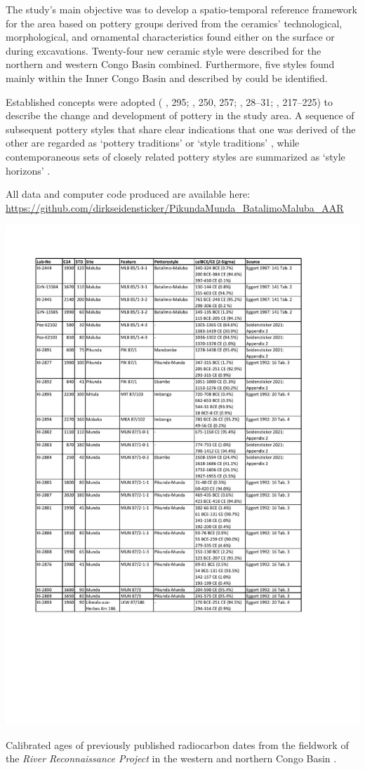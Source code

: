 \documentclass[smallextended,natbib]{svjour3}       %
\begin{document}
The study's main objective was to develop a spatio-temporal reference framework for the area based on pottery groups derived from the ceramics' technological, morphological, and ornamental characteristics found either on the surface or during excavations. Twenty-four new ceramic style were described for the northern and western Congo Basin combined. Furthermore, five styles found mainly within the Inner Congo Basin and described by \citet{Wotzka.1995} could be identified.

Established concepts were adopted (\citeauthor{Eggert.1983} \citeyear{Eggert.1983}, 295; \citeyear{Eggert.1984}, 250, 257; \citeyear{Eggert.1988}, 28--31; \citeauthor{Wotzka.1995} \citeyear{Wotzka.1995}, 217--225) to describe the change and development of pottery in the study area. A sequence of subsequent pottery styles that share clear indications that one was derived of the other are regarded as ‘pottery traditions’ or ‘style traditions’ \citep{Rouse.1957,Willey.1945}, while contemporaneous sets of closely related pottery styles are summarized as ‘style horizons’ \citep[108--111]{Kroeber.1944}.

All data and computer code produced are available here: \url{https://github.com/dirkseidensticker/PikundaMunda_BatalimoMaluba_AAR}

\begin{table}[p]
	\centering
	\includegraphics[width=.9\textwidth]{Tab_Old14C.pdf}
	\caption{Calibrated ages \citep{Reimer.2020} of previously published radiocarbon dates from the fieldwork of the \textit{River Reconnaissance Project} in the western and northern Congo Basin \citep[Appendix 2]{Seidensticker.2021e}.}
	\label{tab:14Cold}	
\end{table}
\end{document}
